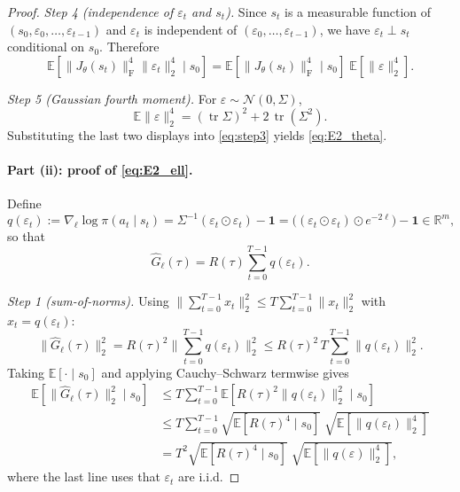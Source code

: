 \begin{proof}
\emph{Step 4 (independence of $\varepsilon_t$ and $s_t$).}
Since $s_t$ is a measurable function of $(s_0,\varepsilon_0,\dots,\varepsilon_{t-1})$
and $\varepsilon_t$ is independent of $(\varepsilon_0,\dots,\varepsilon_{t-1})$,
we have $\varepsilon_t\perp s_t$ conditional on $s_0$. Therefore
\[
\mathbb E[\|J_\theta(s_t)\|_{\mathrm{F}}^4\|\varepsilon_t\|_2^4\mid s_0]
=
\mathbb E[\|J_\theta(s_t)\|_{\mathrm{F}}^4\mid s_0]\;\mathbb E[\|\varepsilon\|_2^4].
\]

\emph{Step 5 (Gaussian fourth moment).}
For $\varepsilon\sim\mathcal N(0,\Sigma)$,
\[
\mathbb E\|\varepsilon\|_2^4
=
(\operatorname{tr}\Sigma)^2 + 2\,\operatorname{tr}(\Sigma^2).
\]
Substituting the last two displays into \eqref{eq:step3} yields \eqref{eq:E2_theta}.
\paragraph{Part (ii): proof of \eqref{eq:E2_ell}.}
Define
\[
q(\varepsilon_t):=\nabla_\ell \log\pi(a_t\mid s_t)
=\Sigma^{-1}(\varepsilon_t\odot\varepsilon_t)-\mathbf 1
=\big((\varepsilon_t\odot\varepsilon_t)\odot e^{-2\ell}\big)-\mathbf 1\in\mathbb R^m,
\]
so that
\[
\widehat G_\ell(\tau)=R(\tau)\sum_{t=0}^{T-1} q(\varepsilon_t).
\]

\emph{Step 1 (sum-of-norms).}
Using $\big\|\sum_{t=0}^{T-1} x_t\big\|_2^2 \le T\sum_{t=0}^{T-1}\|x_t\|_2^2$ with $x_t=q(\varepsilon_t)$:
\[
\|\widehat G_\ell(\tau)\|_2^2
=
R(\tau)^2\Big\|\sum_{t=0}^{T-1}q(\varepsilon_t)\Big\|_2^2
\le
R(\tau)^2\,T\sum_{t=0}^{T-1}\|q(\varepsilon_t)\|_2^2.
\]
Taking $\mathbb E[\cdot\mid s_0]$ and applying Cauchy--Schwarz termwise gives
\begin{align}
\mathbb E[\|\widehat G_\ell(\tau)\|_2^2\mid s_0]
&\le
T\sum_{t=0}^{T-1}
\mathbb E\!\left[R(\tau)^2\|q(\varepsilon_t)\|_2^2\mid s_0\right]\nonumber\\
&\le
T\sum_{t=0}^{T-1}
\sqrt{\mathbb E\!\left[R(\tau)^4\mid s_0\right]}\;
\sqrt{\mathbb E\!\left[\|q(\varepsilon_t)\|_2^4\right]} \nonumber\\
&=
T^2\sqrt{\mathbb E\!\left[R(\tau)^4\mid s_0\right]}\;
\sqrt{\mathbb E\!\left[\|q(\varepsilon)\|_2^4\right]},
\label{eq:ell_bound_reduce}
\end{align}
where the last line uses that $\varepsilon_t$ are i.i.d.


\end{proof}
